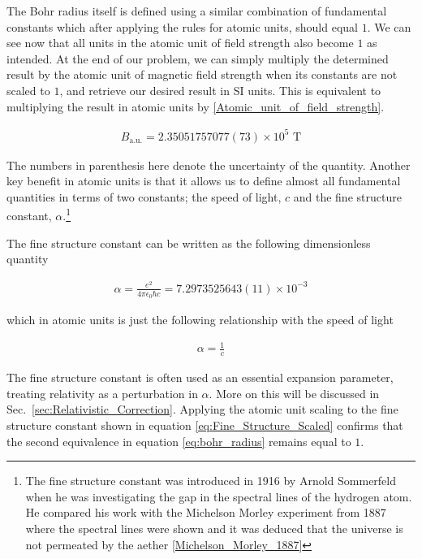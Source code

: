         The Bohr radius itself is defined using a similar combination of fundamental constants which after applying the rules for atomic units, should equal $1$. We can see now that all units in the atomic unit of field strength also become $1$ as intended. At the end of our problem, we can simply multiply the determined result by the atomic unit of magnetic field strength when its constants are not scaled to $1$, and retrieve our desired result in SI units. This is equivalent to multiplying the result in atomic units by \ref{Atomic_unit_of_field_strength}.

        \begin{align}
            B_{\text{a.u.}} = 2.35051757077(73) \times 10^5 \text{ T}
        \end{align}

        The numbers in parenthesis here denote the uncertainty of the quantity. Another key benefit in atomic units is that it allows us to define almost all fundamental quantities in terms of two constants; the speed of light, $c$ and the fine structure constant, $\alpha$.\footnote{The fine structure constant was introduced in 1916 by Arnold Sommerfeld when he was investigating the gap in the spectral lines of the hydrogen atom. He compared his work with the Michelson Morley experiment from 1887 where the spectral lines were shown and it was deduced that the universe is not permeated by the aether \ref{Michelson_Morley_1887}}

        The fine structure constant can be written as the following dimensionless quantity

        \begin{align}
            \alpha = \frac{e^2}{4\pi \epsilon_0 \hbar c} = 7.2973525643(11) \times 10^{-3}   
        \end{align}

        \noindent which in atomic units is just the following relationship with the speed of light 

        \begin{align}
            \alpha = \frac{1}{c} \label{eq:Fine_Structure_Scaled}
        \end{align}

        \noindent The fine structure constant is often used as an essential expansion parameter, treating relativity as a perturbation in $\alpha$. More on this will be discussed in Sec.~\ref{sec:Relativistic_Correction}. Applying the atomic unit scaling to the fine structure constant shown in equation \eqref{eq:Fine_Structure_Scaled} confirms that the second equivalence in equation \eqref{eq:bohr_radius} remains equal to $1$. 

